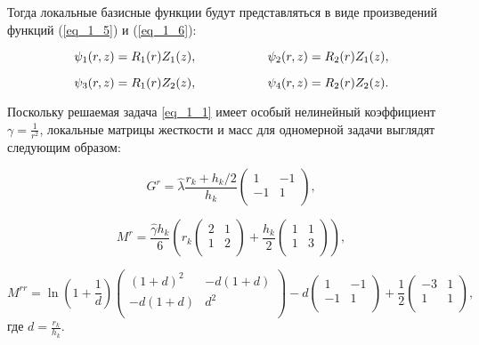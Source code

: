 Тогда локальные базисные функции будут представляться в виде произведений функций (\ref{eq_1_5}) и (\ref{eq_1_6}): 

\begin{equation*}
	\psi_1(r,z) = R_1(r)Z_1(z), \hspace{20mm} \psi_2(r,z) = R_2(r)Z_1(z),
\end{equation*}

\begin{equation*}
	\psi_3(r,z) = R_1(r)Z_2(z), \hspace{20mm} \psi_4(r,z) = R_2(r)Z_2(z).
\end{equation*}

Поскольку решаемая задача \ref{eq_1_1} имеет особый нелинейный коэффициент $\gamma = \frac{1}{r^2}$, локальные матрицы жесткости и масс для одномерной задачи выглядят следующим образом:

\begin{equation*}
	G^r = \hat{\lambda} \frac{r_k + h_k / 2}{h_k} \left(
	\begin{array}{rr}
		 1 & -1\\
		-1 &  1\\
	\end{array}
	\right),
\end{equation*}

\begin{equation*}
	M^r = \frac{\hat{\gamma} h_k}{6} \left( r_k \left(
	\begin{array}{rr}
		2 & 1\\
		1 & 2\\
	\end{array}
	\right) + \frac{h_k}{2} \left(
	\begin{array}{rr}
		1 & 1\\
		1 & 3\\
	\end{array}
	\right) \right),
\end{equation*}


\begin{equation*}
    M^{rr} = \ln\left(1 + \frac{1}{d}\right)
	\left(
	\begin{array}{cc}
		(1+d)^2 & -d(1+d)\\
		-d(1+d) &  d^2\\
	\end{array}
	\right)
	-d
	\left(
	\begin{array}{rr}
		1 & -1\\
		-1 & 1\\
	\end{array}
	\right)
	+ \frac{1}{2}
	\left(
	\begin{array}{rr}
		-3 & 1\\
		1 & 1\\
	\end{array}
	\right),
\end{equation*}
где $d = \frac{r_k}{h_k}$.


